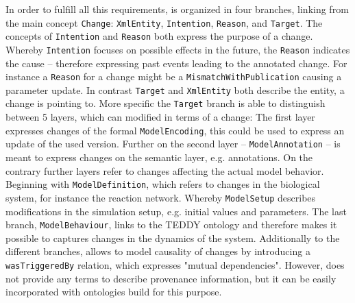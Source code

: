 	In order to fulfill all this requirements, \comodi is organized in four branches, linking from the main concept \texttt{Change}: \texttt{XmlEntity}, \texttt{Intention}, \texttt{Reason}, and \texttt{Target}.
	The concepts of \texttt{Intention} and \texttt{Reason} both express the purpose of a change. Whereby \texttt{Intention} focuses on possible effects in the future, the \texttt{Reason} indicates the cause -- therefore expressing past events leading to the annotated change. For instance a \texttt{Reason} for a change might be a \texttt{MismatchWithPublication} causing a parameter update.
	In contrast \texttt{Target} and \texttt{XmlEntity} both describe the entity, a change is pointing to.
	More specific the \texttt{Target} branch is able to distinguish between 5 layers, which can modified in terms of a change: The first layer expresses changes of the formal \texttt{ModelEncoding}, this could be used to express an update of the used \sbml version.
	Further on the second layer -- \texttt{ModelAnnotation} -- is meant to express changes on the semantic layer, e.g. annotations. 
	On the contrary further layers refer to changes affecting the actual model behavior. Beginning with \texttt{ModelDefinition}, which refers to changes in the biological system, for instance the reaction network. Whereby \texttt{ModelSetup} describes modifications in the simulation setup, e.g. initial values and parameters. The last branch, \texttt{ModelBehaviour}, links to the TEDDY ontology \cite{Courtot2011} and therefore makes it possible to captures changes in the dynamics of the system.
	Additionally to the different branches, \comodi allows to model causality of changes by introducing a \texttt{wasTriggeredBy} relation, which expresses "mutual dependencies". However, \comodi does not provide any terms to describe provenance information, but it can be easily incorporated with ontologies build for this purpose.
	
	
	
